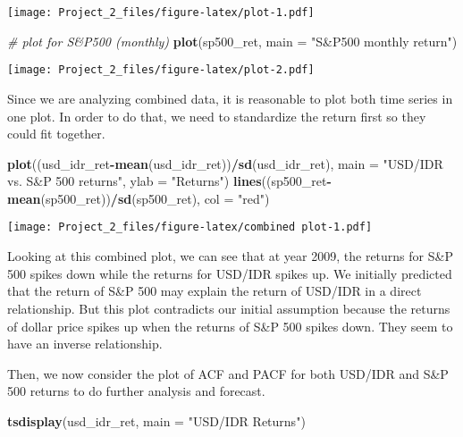 \documentclass[]{article}
\newenvironment{Shaded}{\begin{snugshade}}{\end{snugshade}}
\newcommand{\KeywordTok}[1]{\textcolor[rgb]{0.13,0.29,0.53}{\textbf{#1}}}
\newcommand{\DataTypeTok}[1]{\textcolor[rgb]{0.13,0.29,0.53}{#1}}
\newcommand{\StringTok}[1]{\textcolor[rgb]{0.31,0.60,0.02}{#1}}
\newcommand{\CommentTok}[1]{\textcolor[rgb]{0.56,0.35,0.01}{\textit{#1}}}
\newcommand{\OperatorTok}[1]{\textcolor[rgb]{0.81,0.36,0.00}{\textbf{#1}}}
\newcommand{\NormalTok}[1]{#1}
\begin{document}
\texttt{[image: Project\_2\_files/figure-latex/plot-1.pdf]}

\begin{Shaded}
\begin{Highlighting}[]
\CommentTok{# plot for S&P500 (monthly)}
\KeywordTok{plot}\NormalTok{(sp500_ret, }\DataTypeTok{main =} \StringTok{"S&P500 monthly return"}\NormalTok{) }
\end{Highlighting}
\end{Shaded}

\texttt{[image: Project\_2\_files/figure-latex/plot-2.pdf]}

Since we are analyzing combined data, it is reasonable to plot both time
series in one plot. In order to do that, we need to standardize the
return first so they could fit together.

\begin{Shaded}
\begin{Highlighting}[]
\KeywordTok{plot}\NormalTok{((usd_idr_ret}\OperatorTok{-}\KeywordTok{mean}\NormalTok{(usd_idr_ret))}\OperatorTok{/}\KeywordTok{sd}\NormalTok{(usd_idr_ret), }\DataTypeTok{main =} \StringTok{"USD/IDR vs. S&P 500 returns"}\NormalTok{, }\DataTypeTok{ylab =} \StringTok{"Returns"}\NormalTok{)}
\KeywordTok{lines}\NormalTok{((sp500_ret}\OperatorTok{-}\KeywordTok{mean}\NormalTok{(sp500_ret))}\OperatorTok{/}\KeywordTok{sd}\NormalTok{(sp500_ret), }\DataTypeTok{col =} \StringTok{"red"}\NormalTok{)}
\end{Highlighting}
\end{Shaded}

\texttt{[image: Project\_2\_files/figure-latex/combined plot-1.pdf]}

Looking at this combined plot, we can see that at year 2009, the returns
for S\&P 500 spikes down while the returns for USD/IDR spikes up. We
initially predicted that the return of S\&P 500 may explain the return
of USD/IDR in a direct relationship. But this plot contradicts our
initial assumption because the returns of dollar price spikes up when
the returns of S\&P 500 spikes down. They seem to have an inverse
relationship.

Then, we now consider the plot of ACF and PACF for both USD/IDR and S\&P
500 returns to do further analysis and forecast.

\begin{Shaded}
\begin{Highlighting}[]
\KeywordTok{tsdisplay}\NormalTok{(usd_idr_ret, }\DataTypeTok{main =} \StringTok{"USD/IDR Returns"}\NormalTok{)}
\end{Highlighting}
\end{Shaded}
\end{document}

